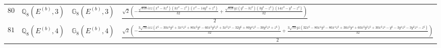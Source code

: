 \documentclass[fleqn,8pt,landscape]{jsarticle}
\begin{document}
\begin{table}[ht!]
\begin{center}
\begin{tabular}{cccl}
$ 80 $ & $ \mathbb{Q}_{8}(E^{(b)},3) $ & $ \mathbb{G}_{8}(E^{(b)},3) $ & $ \frac{\sqrt{2} \left(- \frac{\sqrt{858} i x z \left(x^{2} - 3 z^{2}\right) \left(3 x^{2} - z^{2}\right) \left(x^{2} - 14 y^{2} + z^{2}\right)}{32} + \frac{\sqrt{858} y z \left(y^{2} - 3 z^{2}\right) \left(3 y^{2} - z^{2}\right) \left(14 x^{2} - y^{2} - z^{2}\right)}{32}\right)}{2} $ \\
$ 81 $ & $ \mathbb{Q}_{8}(E^{(b)},4) $ & $ \mathbb{G}_{8}(E^{(b)},4) $ & $ \frac{\sqrt{2} \left(- \frac{3 \sqrt{70} i x z \left(x^{6} - 30 x^{4} y^{2} + 3 x^{4} z^{2} + 80 x^{2} y^{4} - 60 x^{2} y^{2} z^{2} + 3 x^{2} z^{4} - 32 y^{6} + 80 y^{4} z^{2} - 30 y^{2} z^{4} + z^{6}\right)}{32} + \frac{3 \sqrt{70} y z \left(32 x^{6} - 80 x^{4} y^{2} - 80 x^{4} z^{2} + 30 x^{2} y^{4} + 60 x^{2} y^{2} z^{2} + 30 x^{2} z^{4} - y^{6} - 3 y^{4} z^{2} - 3 y^{2} z^{4} - z^{6}\right)}{32}\right)}{2} $ \\
 \hline \hline
\end{tabular}
\end{center}
\end{table}
\end{document}
